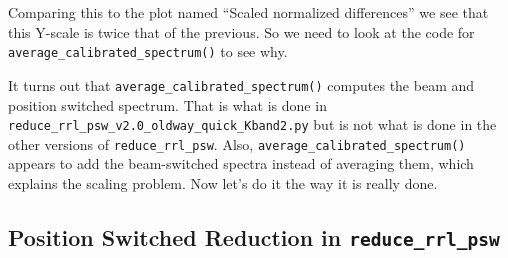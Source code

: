 \documentclass[letterpaper,10pt,english]{/usr/share/sphinx/texinputs/sphinxhowto}
\begin{document}
        
    
Comparing this to the plot named ``Scaled normalized differences'' we
see that this Y-scale is twice that of the previous. So we need to look
at the code for \texttt{average\_calibrated\_spectrum()} to see why.

It turns out that \texttt{average\_calibrated\_spectrum()} computes the
beam and position switched spectrum. That is what is done in
\texttt{reduce\_rrl\_psw\_v2.0\_oldway\_quick\_Kband2.py} but is not
what is done in the other versions of \texttt{reduce\_rrl\_psw}. Also,
\texttt{average\_calibrated\_spectrum()} appears to add the
beam-switched spectra instead of averaging them, which explains the
scaling problem. Now let's do it the way it is really done.

\subsection{Position Switched Reduction in
\texttt{reduce\_rrl\_psw}}\label{position-switched-reduction-in-reduceux5frrlux5fpsw}

\end{document}
